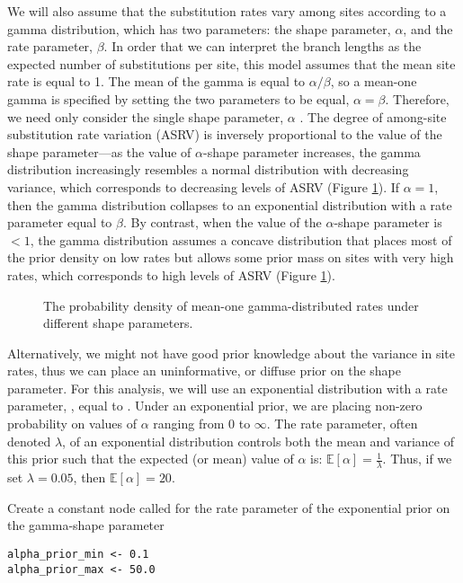 We will also assume that the substitution rates vary among sites according to a gamma distribution, which has two parameters: the shape parameter, $\alpha$, and the rate parameter, $\beta$. 
In order that we can interpret the branch lengths as the expected number of substitutions per site, this model assumes that the mean site rate is equal to 1.
The mean of the gamma is equal to $\alpha/\beta$, so a mean-one gamma is specified by setting the two parameters to be equal, $\alpha=\beta$.
Therefore, we need only consider the single shape parameter, $\alpha$ \citep{yang94a}. 
The degree of among-site substitution rate variation (ASRV) is inversely proportional to the value of the shape parameter---as the value of $\alpha$-shape parameter increases, the gamma distribution increasingly resembles a normal distribution with decreasing variance, which corresponds to decreasing levels of ASRV (Figure \ref{asrhGammaFig}).
If $\alpha = 1$, then the gamma distribution collapses to an exponential distribution with a rate parameter equal to $\beta$.
By contrast, when the value of the $\alpha$-shape parameter is $< 1$, the gamma distribution assumes a concave distribution that places most of the prior density on low rates but allows some prior mass on sites with very high rates, which corresponds to high levels of ASRV (Figure \ref{asrhGammaFig}).

\begin{figure}[h]
\centering
{}
\caption{\small The probability density of mean-one gamma-distributed rates under different shape parameters.}
\label{asrhGammaFig}
\end{figure}


Alternatively, we might not have good prior knowledge about the variance in site rates, thus we can place an uninformative, or diffuse prior on the shape parameter.
For this analysis, we will use an exponential distribution with a rate parameter, , equal to .
Under an exponential prior, we are placing non-zero probability on values of $\alpha$ ranging from 0 to $\infty$. 
The rate parameter, often denoted $\lambda$, of an exponential distribution controls both the mean and variance of this prior such that the expected (or mean) value of $\alpha$ is:
$\mathbb{E}[\alpha] = \frac{1}{\lambda}.$
Thus, if we set $\lambda=0.05$, then $\mathbb{E}[\alpha] = 20$.

Create a constant node called  for the rate parameter of the exponential prior on the gamma-shape parameter
{\tt\begin{snugshade*}
\begin{lstlisting}
alpha_prior_min <- 0.1
alpha_prior_max <- 50.0
\end{lstlisting}
\end{snugshade*}}

